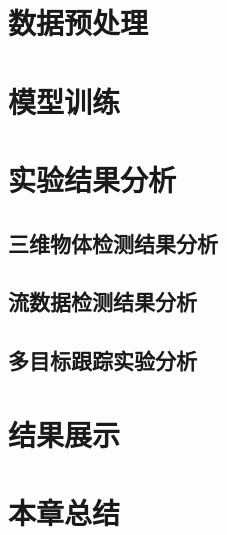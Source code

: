 \section{数据预处理}
\label{preprocessing}


\section{模型训练}
\label{training}


\section{实验结果分析}
\label{results}


\subsection{三维物体检测结果分析}
\label{ablation_study}






\subsection{流数据检测结果分析}
\label{stream_result}



\subsection{多目标跟踪实验分析}
\label{mot_result}






\section{结果展示}
\label{show}

\section{本章总结}
\label{exp_conclusion}


\ifprint
	\newpage
	\thispagestyle{empty}
	\mbox{}
	
	\clearpage
	\setcounter{page}{10}
\fi